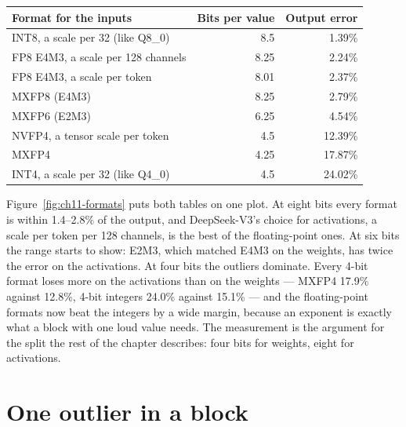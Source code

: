 \begin{center}\small
\begin{tabular}{@{}lrr@{}}
\toprule
Format for the inputs & Bits per value & Output error \\
\midrule
INT8, a scale per 32 (like Q8\_0) & 8.5 & 1.39\% \\
FP8 E4M3, a scale per 128 channels & 8.25 & 2.24\% \\
FP8 E4M3, a scale per token & 8.01 & 2.37\% \\
MXFP8 (E4M3) & 8.25 & 2.79\% \\
MXFP6 (E2M3) & 6.25 & 4.54\% \\
NVFP4, a tensor scale per token & 4.5 & 12.39\% \\
MXFP4 & 4.25 & 17.87\% \\
INT4, a scale per 32 (like Q4\_0) & 4.5 & 24.02\% \\
\bottomrule
\end{tabular}
\end{center}


\noindent Figure~\ref{fig:ch11-formats} puts both tables on one plot. At eight bits every format is within 1.4--2.8\% of the output, and
DeepSeek-V3's choice for activations, a scale per token per 128 channels, is the
best of the floating-point ones. At six bits the range starts to show: E2M3,
which matched E4M3 on the weights, has twice the error on the activations. At
four bits the outliers dominate. Every 4-bit format loses more on the
activations than on the weights --- MXFP4 17.9\% against 12.8\%, 4-bit integers
24.0\% against 15.1\% --- and the floating-point formats now beat the integers
by a wide margin, because an exponent is exactly what a block with one loud
value needs. The measurement is the argument for the split the rest of the
chapter describes: four bits for weights, eight for activations.

\section{One outlier in a block}

